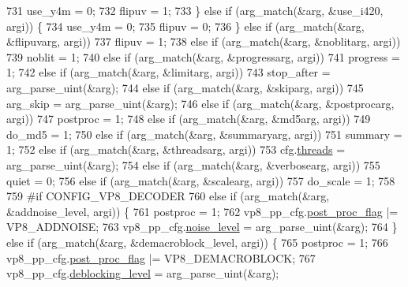 \begin{DoxyCodeInclude}
{{{{{{{{{{{{{{{{{{{{{{{{731       use\_y4m = 0;
732       flipuv = 1;
733     \} \textcolor{keywordflow}{else} \textcolor{keywordflow}{if} (arg\_match(&arg, &use\_i420, argi)) \{
734       use\_y4m = 0;
735       flipuv = 0;
736     \} \textcolor{keywordflow}{else} \textcolor{keywordflow}{if} (arg\_match(&arg, &flipuvarg, argi))
737       flipuv = 1;
738     \textcolor{keywordflow}{else} \textcolor{keywordflow}{if} (arg\_match(&arg, &noblitarg, argi))
739       noblit = 1;
740     \textcolor{keywordflow}{else} \textcolor{keywordflow}{if} (arg\_match(&arg, &progressarg, argi))
741       progress = 1;
742     \textcolor{keywordflow}{else} \textcolor{keywordflow}{if} (arg\_match(&arg, &limitarg, argi))
743       stop\_after = arg\_parse\_uint(&arg);
744     \textcolor{keywordflow}{else} \textcolor{keywordflow}{if} (arg\_match(&arg, &skiparg, argi))
745       arg\_skip = arg\_parse\_uint(&arg);
746     \textcolor{keywordflow}{else} \textcolor{keywordflow}{if} (arg\_match(&arg, &postprocarg, argi))
747       postproc = 1;
748     \textcolor{keywordflow}{else} \textcolor{keywordflow}{if} (arg\_match(&arg, &md5arg, argi))
749       do\_md5 = 1;
750     \textcolor{keywordflow}{else} \textcolor{keywordflow}{if} (arg\_match(&arg, &summaryarg, argi))
751       summary = 1;
752     \textcolor{keywordflow}{else} \textcolor{keywordflow}{if} (arg\_match(&arg, &threadsarg, argi))
753       cfg.\hyperlink{structvpx__codec__dec__cfg_afca69d81e99ee15e1d641a639aefb7eb}{threads} = arg\_parse\_uint(&arg);
754     \textcolor{keywordflow}{else} \textcolor{keywordflow}{if} (arg\_match(&arg, &verbosearg, argi))
755       quiet = 0;
756     \textcolor{keywordflow}{else} \textcolor{keywordflow}{if} (arg\_match(&arg, &scalearg, argi))
757       do\_scale = 1;
758 
759 \textcolor{preprocessor}{#if CONFIG\_VP8\_DECODER}
760     \textcolor{keywordflow}{else} \textcolor{keywordflow}{if} (arg\_match(&arg, &addnoise\_level, argi)) \{
761       postproc = 1;
762       vp8\_pp\_cfg.\hyperlink{structvp8__postproc__cfg_ae9adc230642ac230f39eb4c531cf85e5}{post\_proc\_flag} |= VP8\_ADDNOISE;
763       vp8\_pp\_cfg.\hyperlink{structvp8__postproc__cfg_a32f28e4003e5d9bf55d188247f3f156c}{noise\_level} = arg\_parse\_uint(&arg);
764     \} \textcolor{keywordflow}{else} \textcolor{keywordflow}{if} (arg\_match(&arg, &demacroblock\_level, argi)) \{
765       postproc = 1;
766       vp8\_pp\_cfg.\hyperlink{structvp8__postproc__cfg_ae9adc230642ac230f39eb4c531cf85e5}{post\_proc\_flag} |= VP8\_DEMACROBLOCK;
767       vp8\_pp\_cfg.\hyperlink{structvp8__postproc__cfg_afe919a9546e79798d840b1492f7e0249}{deblocking\_level} = arg\_parse\_uint(&arg);
}}}}}}}}}}}}}}}}}}}}}}}}
\end{DoxyCodeInclude}
